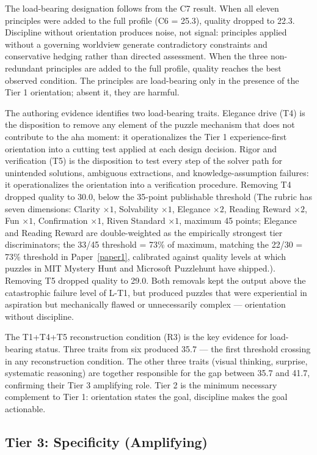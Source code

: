 The load-bearing designation follows from the C7 result. When all eleven principles
were added to the full profile (C6 = 25.3), quality dropped to 22.3. Discipline
without orientation produces noise, not signal: principles applied without a
governing worldview generate contradictory constraints and conservative hedging
rather than directed assessment. When the three non-redundant principles are added to
the full profile, quality reaches the best observed condition. The principles are
load-bearing only in the presence of the Tier 1 orientation; absent it, they are
harmful.

The authoring evidence identifies two load-bearing traits. Elegance drive (T4) is
the disposition to remove any element of the puzzle mechanism that does not contribute
to the aha moment: it operationalizes the Tier 1 experience-first orientation into a
cutting test applied at each design decision. Rigor and verification (T5) is the
disposition to test every step of the solver path for unintended solutions, ambiguous
extractions, and knowledge-assumption failures: it operationalizes the orientation
into a verification procedure. Removing T4 dropped quality to 30.0, below the 35-point
publishable threshold (The rubric has seven dimensions: Clarity $\times 1$, Solvability
$\times 1$, Elegance $\times 2$, Reading Reward $\times 2$, Fun $\times 1$, Confirmation
$\times 1$, Riven Standard $\times 1$, maximum 45 points; Elegance and Reading Reward are
double-weighted as the empirically strongest tier discriminators; the 33/45 threshold =
73\% of maximum, matching the 22/30 = 73\% threshold in Paper~\ref{paper1}, calibrated
against quality levels at which puzzles in MIT Mystery Hunt and Microsoft Puzzlehunt have
shipped.). Removing T5 dropped quality to 29.0. Both removals kept the
output above the catastrophic failure level of L-T1, but produced puzzles that were
experiential in aspiration but mechanically flawed or unnecessarily complex ---
orientation without discipline.

The T1+T4+T5 reconstruction condition (R3) is the key evidence for load-bearing
status. Three traits from six produced 35.7 --- the first threshold crossing in any
reconstruction condition. The other three traits (visual thinking, surprise,
systematic reasoning) are together responsible for the gap between 35.7 and 41.7,
confirming their Tier 3 amplifying role. Tier 2 is the minimum necessary complement
to Tier 1: orientation states the goal, discipline makes the goal actionable.

\subsection{Tier 3: Specificity (Amplifying)}

